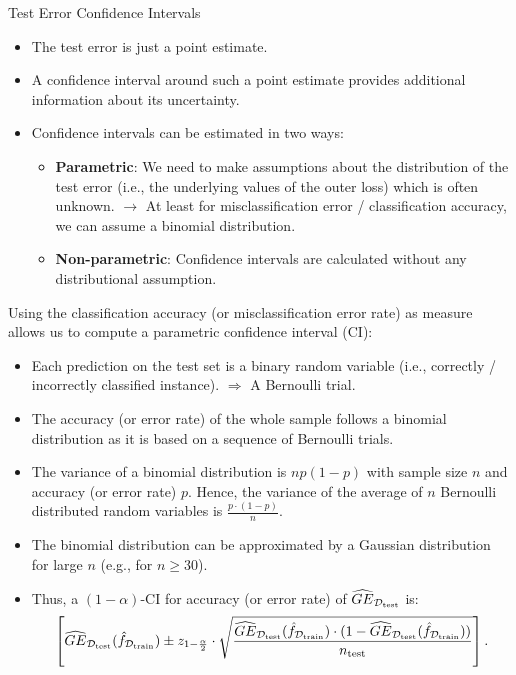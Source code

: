 \begin{vbframe}{Test Error Confidence Intervals}
\begin{itemize}
  \item The test error is just a point estimate.
  \item A confidence interval around such a point estimate provides additional information about its uncertainty.
  \item Confidence intervals can be estimated in two ways:
  \begin{itemize}
    \item \textbf{Parametric}: %
    We need to make assumptions about the distribution of the test error (i.e., the underlying values of the outer loss) which is often unknown. \newline
    $\rightarrow$ At least for misclassification error / classification accuracy, we can assume a binomial distribution.
    \item \textbf{Non-parametric}: Confidence intervals are calculated without any distributional assumption.
  \end{itemize}
\end{itemize}

\framebreak

Using the classification accuracy (or misclassification error rate) as measure allows us to compute a parametric confidence interval (CI):

\begin{itemize}
  \item Each prediction on the test set is a binary random variable (i.e., correctly / incorrectly classified instance). $\Rightarrow$ A Bernoulli trial.
  \item The accuracy (or error rate) of the whole sample follows a binomial distribution as it is based on a sequence of Bernoulli trials.
  \item The variance of a binomial distribution is $np(1-p)$ with sample size $n$ and accuracy (or error rate) $p$.
  Hence, the variance of the average of $n$ Bernoulli distributed random variables is $\frac{p \cdot (1-p)}{n}$.
  \item The binomial distribution can be approximated by a Gaussian distribution for large $n$ (e.g., for $n \geq 30$).
  \item Thus, a $(1-\alpha)$-CI for accuracy (or error rate) of $\widehat{GE}_{\mathcal{D}_{\text{test}}}$ is:
  $$\left[\widehat{GE}_{\mathcal{D}_{\text{test}}}(\hat{f}_{\mathcal{D}_{\text{train}}}) \pm z_{1-\frac{\alpha}{2}}  \cdot \sqrt{\frac{\widehat{GE}_{\mathcal{D}_{\text{test}}}(\hat{f}_{\mathcal{D}_{\text{train}}}) \cdot (1-\widehat{GE}_{\mathcal{D}_{\text{test}}}(\hat{f}_{\mathcal{D}_{\text{train}}}))}{n_{\text{test}}}} \right].$$


\end{itemize}
\end{vbframe}
